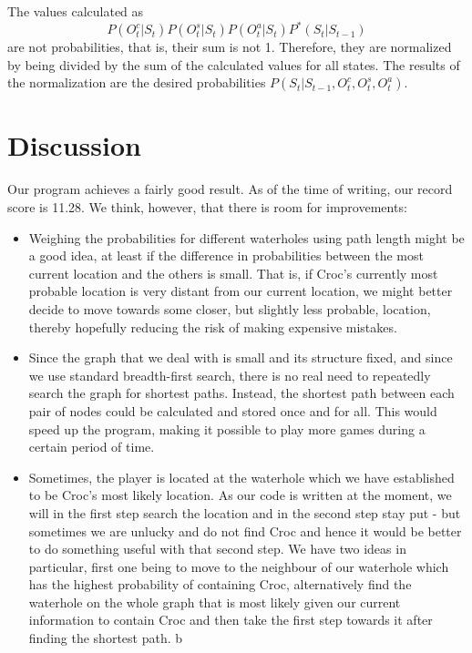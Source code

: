 \documentclass[a4paper]{article}
\begin{document}
The values calculated as
\begin{equation*}
  P(O^c_t|S_t)P(O^s_t|S_t)P(O^a_t|S_t)P^*(S_t|S_{t-1})
\end{equation*}
are not probabilities, that is, their sum is not 1. Therefore, they are
normalized by being divided by the sum of the calculated values for all
states. The results of the normalization are the desired probabilities $P(S_t|S_{t-1}, O^c_t, O^s_t, O^a_t)$.

\section{Discussion}

Our program achieves a fairly good result. As of the time of writing, our
record score is 11.28. We think, however, that there is room for improvements:
\begin{itemize}
\item Weighing the probabilities for different waterholes using path length
  might be a good idea, at least if the difference in probabilities between
  the most current location and the others is small. That is, if Croc's currently most probable location is
  very distant from our current location, we might better decide to move
  towards some closer, but slightly less probable, location, thereby hopefully
  reducing the risk of making expensive mistakes.
\item Since the graph that we deal with is small and its structure fixed, and since we use standard breadth-first
  search, there is no real need to repeatedly search the graph for shortest
  paths. Instead, the shortest path between each pair of nodes could be
  calculated and stored once and for all. This would speed up the program,
  making it possible to play more games during a certain period of time.
  \item Sometimes, the player is located at the waterhole which we have established to be Croc's most likely location.
  As our code is written at the moment, we will in the first step search the location and in the second step stay put -
  but sometimes we are unlucky and do not find Croc and hence it would be better to do something useful
  with that second step. We have two ideas in particular, first one being to move to the neighbour of our waterhole 
  which has the highest probability of containing Croc, alternatively find the waterhole on the whole graph that 
  is most likely given our current information to contain Croc and then take the first step towards it after finding 
  the shortest path.
  b
\end{itemize}
\end{document}

